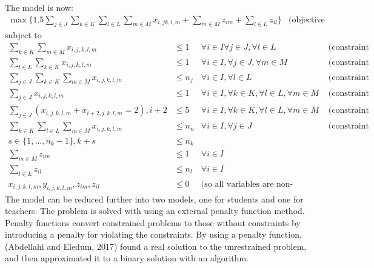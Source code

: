 \documentclass[a4paper, 12pt]{report}
\begin{document}
The model is now:
\begin{align*}
	\max\{1.5 \sum_{j \in J} \sum_{k \in K} \sum_{l \in L} \sum_{m \in M} x_{i,j
	k,l,m} + \sum_{m \in M} z_{im} + \sum_{l \in L}z_{il} \} & \text{(objective
	function)}
\end{align*}
subject to
\begin{align*}
	\sum_{k \in K} \sum_{m \in M} x_{i,j,k,l,m} &\leq 1 & \forall i \in I
	\forall j \in J, \forall l \in L & \text{ (constraint 1)} \\
	\sum_{l \in L} \sum_{k \in K} x_{i,j,k,l,m} &\leq 1 & \forall i \in I,
	\forall j \in J, \forall m \in M & \text{ (constraint 2)} \\
	\sum_{j \in J} \sum_{k \in K} \sum_{m \in M} x_{i,j,k,l,m} &\leq n_j &
	\forall i \in I, \forall l \in L & \text{ (constraint 4)} \\
	\sum_{j \in J}x_{i,j,k,l,m} &\leq 1 & \forall i \in I, \forall k \in K,
	\forall l \in L, \forall m \in M & \text{ (constraint 5)} \\
	\sum_{j \in J}(x_{i,j,k,l,m} + x_{i+2,j,k,l,m} = 2), i + 2 &\leq 5 & \forall
	i \in I, \forall k \in K, \forall l \in L, \forall m \in M & 
	\text{ (constraint 6)} \\
	\sum_{k \in K} \sum_{l \in L} \sum_{m \in M} x_{i,j,k,l,m} &\leq n_n &
	\forall i \in I, \forall j \in J & \text{ (constraint 9)} \\
	s \in \{1, \ldots, n_k - 1\}, k + s &\leq n_k \\
	\sum_{m \in M}z_{im} &\leq 1 & \forall i \in I \\
	\sum_{l \in L} z_{il} &\leq n_l & \forall i \in I \\
	x_{i,j,k,l,m}, y_{i,j,k,l,m}, z_{im}, z_{il} &\leq 0 & \text{(so all
	variables are non-negative)}
\end{align*}
The model can be reduced further into two models, one for students and one for
teachers.
The problem is solved with using an external penalty function method. Penalty
functions convert constrained problems to those without constraints by
introducing a penalty for violating the constraints. By using a penalty
function, (Abdellahi and Eledum, 2017) found a real solution to the
unrestrained problem, and then approximated it to a binary solution with an
algorithm.
\end{document}
